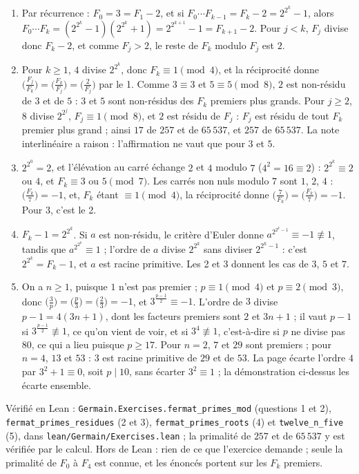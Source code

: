 \documentclass[11pt,a4paper]{article}
\begin{document}
\begin{solution}
\begin{enumerate}
\item Par récurrence : $F_0 = 3 = F_1 - 2$, et si $F_0\cdots F_{k-1} = F_k - 2 =
  2^{2^k} - 1$, alors $F_0\cdots F_k = (2^{2^k} - 1)(2^{2^k} + 1) = 2^{2^{k+1}} - 1 =
  F_{k+1} - 2$. Pour $j < k$, $F_j$ divise donc $F_k - 2$, et comme $F_j > 2$, le reste
  de $F_k$ modulo $F_j$ est $2$.
\item Pour $k \ge 1$, $4$ divise $2^{2^k}$, donc $F_k \equiv 1 \pmod 4$, et la
  réciprocité donne $\bigl(\frac{F_j}{F_k}\bigr) = \bigl(\frac{F_k}{F_j}\bigr) =
  \bigl(\frac{2}{F_j}\bigr)$ par le 1. Comme $3 \equiv 3$ et $5 \equiv 5 \pmod 8$, $2$
  est non-résidu de $3$ et de $5$ : $3$ et $5$ sont non-résidus des $F_k$ premiers plus
  grands. Pour $j \ge 2$, $8$ divise $2^{2^j}$, $F_j \equiv 1 \pmod 8$, et $2$ est
  résidu de $F_j$ : $F_j$ est résidu de tout $F_k$ premier plus grand ; ainsi $17$ de
  $257$ et de $65\,537$, et $257$ de $65\,537$. La note interlinéaire a raison :
  l'affirmation ne vaut que pour $3$ et $5$.
\item $2^{2^0} = 2$, et l'élévation au carré échange $2$ et $4$ modulo $7$
  ($4^2 = 16 \equiv 2$) : $2^{2^k} \equiv 2$ ou $4$, et $F_k \equiv 3$ ou $5 \pmod 7$.
  Les carrés non nuls modulo $7$ sont $1$, $2$, $4$ : $\bigl(\frac{F_k}{7}\bigr) = -1$,
  et, $F_k$ étant $\equiv 1 \pmod 4$, la réciprocité donne
  $\bigl(\frac{7}{F_k}\bigr) = \bigl(\frac{F_k}{7}\bigr) = -1$. Pour $3$, c'est le 2.
\item $F_k - 1 = 2^{2^k}$. Si $a$ est non-résidu, le critère d'Euler donne
  $a^{2^{2^k - 1}} \equiv -1 \not\equiv 1$, tandis que $a^{2^{2^k}} \equiv 1$ ; l'ordre
  de $a$ divise $2^{2^k}$ sans diviser $2^{2^k - 1}$ : c'est $2^{2^k} = F_k - 1$, et $a$
  est racine primitive. Les 2 et 3 donnent les cas de $3$, $5$ et $7$.
\item On a $n \ge 1$, puisque $1$ n'est pas premier ; $p \equiv 1 \pmod 4$ et
  $p \equiv 2 \pmod 3$, donc $\bigl(\frac3p\bigr) = \bigl(\frac p3\bigr) =
  \bigl(\frac23\bigr) = -1$, et $3^{\frac{p-1}{2}} \equiv -1$. L'ordre de $3$ divise
  $p - 1 = 4(3n+1)$, dont les facteurs premiers sont $2$ et $3n+1$ ; il vaut $p - 1$
  si $3^{\frac{p-1}{2}} \not\equiv 1$, ce qu'on vient de voir, et si $3^4 \not\equiv 1$,
  c'est-à-dire si $p$ ne divise pas $80$, ce qui a lieu puisque $p \ge 17$. Pour
  $n = 2$, $7$ et $29$ sont premiers ; pour $n = 4$, $13$ et $53$ : $3$ est racine
  primitive de $29$ et de $53$. La page écarte l'ordre $4$ par $3^2 + 1 \equiv 0$,
  soit $p \mid 10$, sans écarter $3^2 \equiv 1$ ; la démonstration ci-dessus les écarte
  ensemble.
\end{enumerate}

Vérifié en Lean : \texttt{Germain.Exercises.fermat\_primes\_mod} (questions 1 et 2),
\texttt{fermat\_primes\_residues} (2 et 3), \texttt{fermat\_primes\_roots} (4) et
\texttt{twelve\_n\_five} (5), dans \texttt{lean/Germain/Exercises.lean} ; la primalité de $257$ et de
$65\,537$ y est vérifiée par le calcul. Hors de Lean : rien de ce que l'exercice
demande ; seule la primalité de $F_0$ à $F_4$ est connue, et les énoncés portent sur
les $F_k$ premiers.
\end{solution}
\end{document}
